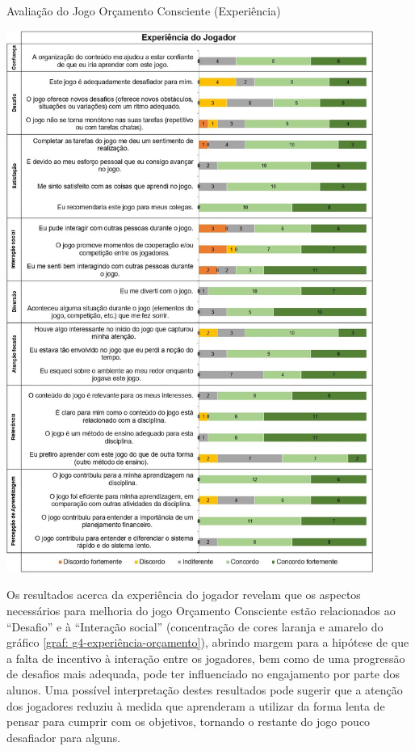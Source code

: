 \graphicspath{{graficos/}} 
\begin{grafico}[!ht]
\centering
\begin{minipage}{0.9\textwidth}
\caption{Avaliação do Jogo Orçamento Consciente (Experiência)}
\centering
\includegraphics[width=0.9\textwidth]{g4-experiência-orçamento}
\label{graf: g4-experiência-orçamento}
\end{minipage}
\end{grafico}

Os resultados acerca da experiência do jogador revelam que os aspectos necessários para melhoria do jogo Orçamento Consciente estão relacionados ao “Desafio” e à “Interação social” (concentração de cores laranja e amarelo do gráfico \ref{graf: g4-experiência-orçamento}), abrindo margem para a hipótese de que a falta de incentivo à interação entre os jogadores, bem como de uma progressão de desafios mais adequada, pode ter influenciado no engajamento por parte dos alunos. Uma possível interpretação destes resultados pode sugerir que a atenção dos jogadores reduziu à medida que aprenderam a utilizar da forma lenta de pensar para cumprir com os objetivos, tornando o restante do jogo pouco desafiador para alguns.

